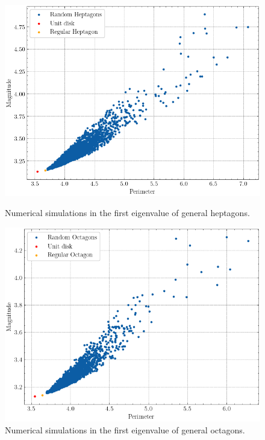 \begin{figure}[!htb]
    \vspace{0.5cm}

    \begin{minipage}[b]{0.45\textwidth}
        \centering
        \includegraphics[width=\textwidth]{Images/Dirac/Polygons/heptagons.png}
    \caption{Numerical simulations in the first eigenvalue of general heptagons.}
    \label{dirac_polya_szego_evidence_heptagons}
    \end{minipage}
    \hfill
    \begin{minipage}[b]{0.45\textwidth}
        \centering
        \includegraphics[width=\textwidth]{Images/Dirac/Polygons/octagons.png}
    \caption{Numerical simulations in the first eigenvalue of general octagons.}
    \label{dirac_polya_szego_evidence_octagons}
    \end{minipage}
\end{figure}

